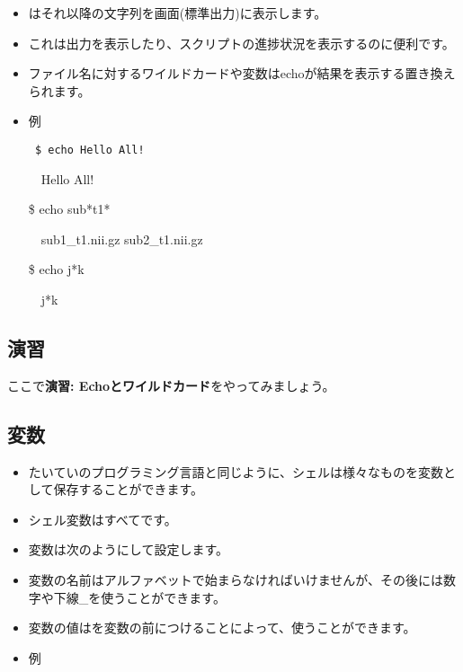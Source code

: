 \documentclass{jsarticle}
\begin{document}
\begin{itemize}
\item {\color{red}}はそれ以降の文字列を画面(標準出力)に表示します。
\item これは出力を表示したり、スクリプトの進捗状況を表示するのに便利です。

\bigskip

\item ファイル名に対するワイルドカードや変数はechoが結果を表示する{\color{red}{\bf 前に}}置き換えられます。

\bigskip

\item 例

{\color{red} {\tt 
\$ echo Hello All!

　Hello All!

\$ echo sub*t1*

　sub1\_t1.nii.gz sub2\_t1.nii.gz

\$ echo j*k

　j*k
}}

\end{itemize}

\subsection*{演習}

ここで{\bf 演習: Echoとワイルドカード}をやってみましょう。



\subsection{変数}


\begin{itemize}
\item たいていのプログラミング言語と同じように、シェルは様々なものを変数として保存することができます。
\item シェル変数はすべて{\color{red}{\bf 文字列}}です。

\item 変数は次のようにして設定します。

{\color{red}{\bf
変数名=値
}}

\item 変数の名前はアルファベットで始まらなければいけませんが、その後には数字や下線\_を使うことができます。
\item 変数の値は{\color{red}{\tt \$}}を変数の前につけることによって、使うことができます。

\item 例

{\color{red}{\tt
\$ var1=im1.nii.gz

\$ echo \$var1

　im1.nii.gz

\$ echo var1

　var1

\$ ls \$var1

　im1.nii.gz 
}}

\end{itemize}
\end{document}
